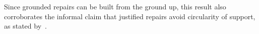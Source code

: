 

Since grounded repairs can be built from the ground up, this result also corroborates the informal claim that justified repairs avoid circularity of support, as stated by~\citet{tplp/CaropreseT11}.

